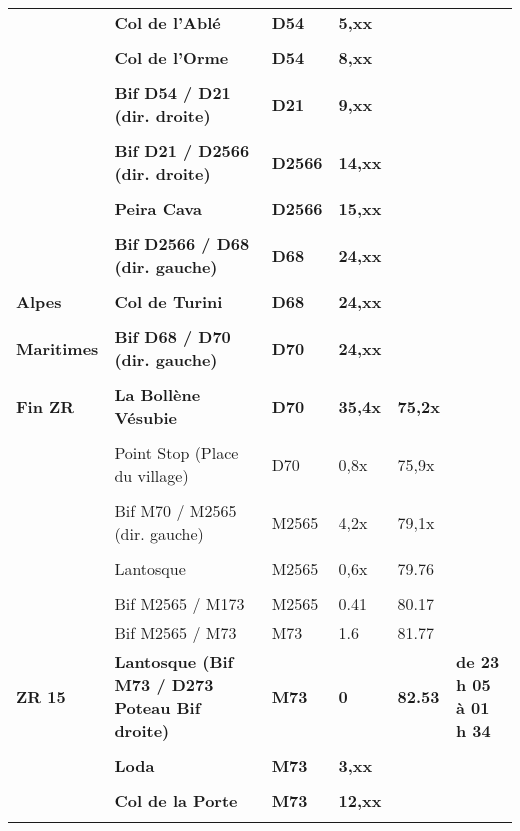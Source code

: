 \documentclass{article}%
\begin{document}
\begin{longtable}{p{2.25cm}|p{7.0cm}|p{1.5cm}|p{1.5cm}|p{1.5cm}|p{3.5cm}}
 &\textbf{Col de l'Ablé}&\textbf{D54}&\textbf{5,xx}& & \\%
 & & & & & \\%
 &\textbf{Col de l'Orme}&\textbf{D54}&\textbf{8,xx}& & \\%
 & & & & & \\%
 &\textbf{Bif D54 / D21 (dir. droite)}&\textbf{D21}&\textbf{9,xx}& & \\%
 & & & & & \\%
 &\textbf{Bif D21 / D2566 (dir. droite)}&\textbf{D2566}&\textbf{14,xx}& & \\%
 & & & & & \\%
 &\textbf{Peira Cava}&\textbf{D2566}&\textbf{15,xx}& & \\%
 & & & & & \\%
 &\textbf{Bif D2566 / D68 (dir. gauche)}&\textbf{D68}&\textbf{24,xx}& & \\%
 & & & & & \\%
\textbf{Alpes }&\textbf{Col de Turini}&\textbf{D68}&\textbf{24,xx}& & \\%
 & & & & & \\%
\textbf{Maritimes}&\textbf{Bif D68 / D70 (dir. gauche)}&\textbf{D70}&\textbf{24,xx}& & \\%
 & & & & & \\%
\textbf{Fin ZR}&\textbf{La Bollène Vésubie}&\textbf{D70}&\textbf{35,4x}&\textbf{75,2x}& \\%
 & & & & & \\%
 &Point Stop  (Place du village) &D70&0,8x&75,9x& \\%
 & & & & & \\%
 &Bif M70 / M2565 (dir. gauche)&M2565 &4,2x&79,1x& \\%
 & & & & & \\%
 &Lantosque&M2565&0,6x&79.76& \\%
 & & & & & \\%
 &Bif M2565 / M173&M2565&0.41&80.17& \\%
 &Bif M2565 / M73&M73&1.6&81.77& \\%
\textbf{ZR 15 }&\textbf{Lantosque (Bif M73 / D273 Poteau Bif droite)}&\textbf{M73}&\textbf{0}&\textbf{82.53}&\textbf{de 23 h 05 à 01 h 34}\\%
 & & & & & \\%
 &\textbf{Loda}&\textbf{M73}&\textbf{3,xx}& & \\%
 & & & & & \\%
 &\textbf{Col de la Porte}&\textbf{M73}&\textbf{12,xx}& & \\%
 & & & & & \\%

\end{longtable}
\end{document}
